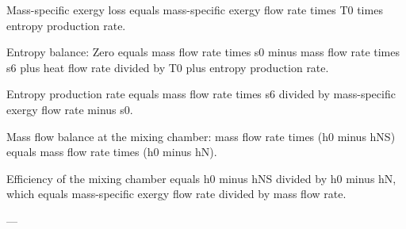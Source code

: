 Mass-specific exergy loss equals mass-specific exergy flow rate times T0 times entropy production rate.  

Entropy balance: Zero equals mass flow rate times s0 minus mass flow rate times s6 plus heat flow rate divided by T0 plus entropy production rate.  

Entropy production rate equals mass flow rate times s6 divided by mass-specific exergy flow rate minus s0.  

Mass flow balance at the mixing chamber: mass flow rate times (h0 minus hNS) equals mass flow rate times (h0 minus hN).  

Efficiency of the mixing chamber equals h0 minus hNS divided by h0 minus hN, which equals mass-specific exergy flow rate divided by mass flow rate.  

---